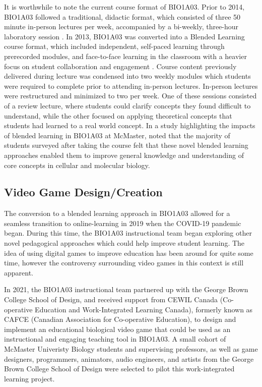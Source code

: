 \documentclass[10pt]{article}
\begin{document}
It is worthwhile to note the current course format of BIO1A03. Prior to 2014, BIO1A03 followed a traditional, didactic format, which consisted of three 50 minute in-person lectures per week, accompanied by a bi-weekly, three-hour laboratory session \citep{tahir2022blended}. In 2013, BIO1A03 was converted into a Blended Learning course format, which included independent, self-paced learning through prerecorded modules, and face-to-face learning in the classroom with a heavier focus on student collaboration and engagement \citep{tahir2022blended}. Course content previously delivered during lecture was condensed into two weekly modules which students were required to complete prior to attending in-person lectures. In-person lectures were restructured and minimized to two per week. One of these sessions consisted of a review lecture, where students could clarify concepts they found difficult to understand, while the other focused on applying theoretical concepts that students had learned to a real world concept. In a study highlighting the impacts of blended learning in BIO1A03 at McMaster, \citet{tahir2022blended} noted that the majority of students surveyed after taking the course felt that these novel blended learning approaches enabled them to improve general knowledge and understanding of core concepts in cellular and molecular biology.

\subsection{Video Game Design/Creation}

The conversion to a blended learning approach in BIO1A03 allowed for a seamless transition to online-learning in 2019 when the COVID-19 pandemic began. During this time, the BIO1A03 instructional team began exploring other novel pedagogical approaches which could help improve student learning. The idea of using digital games to improve education has been around for quite some time, however the controversy surrounding video games in this context is still apparent.

In 2021, the BIO1A03 instructional team partnered up with the George Brown College School of Design, and received support from CEWIL Canada (Co-operative Education and Work-Integrated Learning Canada), formerly known as CAFCE (Canadian Association for Co-operative Education), to design and implement an educational biological video game that could be used as an instructional and engaging teaching tool in BIO1A03. A small cohort of McMaster Univeristy Biology students and supervising professors, as well as game designers, programmers, animators, audio engineers, and artists from the George Brown College School of Design were selected to pilot this work-integrated learning project.
\end{document}

